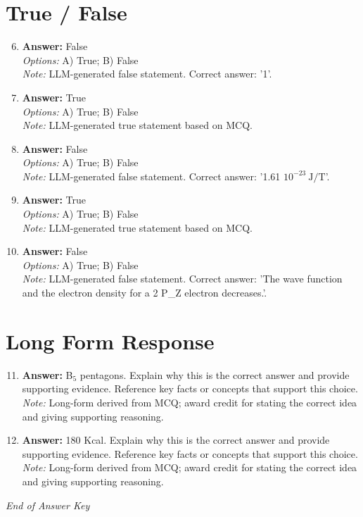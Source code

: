 \documentclass[12pt]{article}
\begin{document}
\section*{True / False}
\begin{enumerate}[label=\arabic*.]
\setcounter{enumi}{5}
\item \textbf{Answer:} False
\\ \textit{Options:} A) True; B) False
\\ \textit{Note:} LLM-generated false statement. Correct answer: '1'.
\item \textbf{Answer:} True
\\ \textit{Options:} A) True; B) False
\\ \textit{Note:} LLM-generated true statement based on MCQ.
\item \textbf{Answer:} False
\\ \textit{Options:} A) True; B) False
\\ \textit{Note:} LLM-generated false statement. Correct answer: '1.61 $10^{-23} \mathrm{~J} / \mathrm{T}$'.
\item \textbf{Answer:} True
\\ \textit{Options:} A) True; B) False
\\ \textit{Note:} LLM-generated true statement based on MCQ.
\item \textbf{Answer:} False
\\ \textit{Options:} A) True; B) False
\\ \textit{Note:} LLM-generated false statement. Correct answer: 'The wave function and the electron density for a 2 P\_Z electron decreases.'.
\end{enumerate}

\section*{Long Form Response}
\begin{enumerate}[label=\arabic*.]
\setcounter{enumi}{10}
\item \textbf{Answer:} B$_{5}$ pentagons. Explain why this is the correct answer and provide supporting evidence. Reference key facts or concepts that support this choice.
\\ \textit{Note:} Long-form derived from MCQ; award credit for stating the correct idea and giving supporting reasoning.
\item \textbf{Answer:} 180 Kcal. Explain why this is the correct answer and provide supporting evidence. Reference key facts or concepts that support this choice.
\\ \textit{Note:} Long-form derived from MCQ; award credit for stating the correct idea and giving supporting reasoning.
\end{enumerate}

\vfill
\noindent\textit{End of Answer Key}
\end{document}
